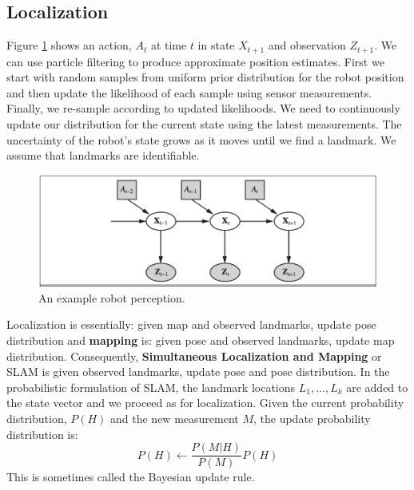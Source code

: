\documentclass[twoside]{article}
\begin{document}
\subsection{Localization}
Figure \ref{fig:localization} shows an action, \(A_t\) at time \(t\) in state 
\(X_{t+1}\) and observation \(Z_{t+1}\). We can use particle filtering to 
produce approximate position estimates. First we start with random samples from
uniform prior distribution for the robot position and then update the likelihood
of each sample using sensor measurements. Finally, we re-sample according to 
updated likelihoods. We need to continuously update our distribution for the 
current state using the latest measurements. The uncertainty of the robot's 
state grows as it moves until we find a landmark. We assume that landmarks are 
identifiable.
\begin{figure}
  \includegraphics[width=\linewidth]{localization.png}
  \caption{An example robot perception.}
  \label{fig:localization}
\end{figure}
Localization is essentially: given map and observed landmarks, update pose 
distribution and \textbf{mapping} is: given pose and observed landmarks, update
map distribution. Consequently, \textbf{Simultaneous Localization and Mapping} 
or SLAM is given observed landmarks, update pose and pose distribution. In the
probabilistic formulation of SLAM, the landmark locations \(L_1,...,L_k\) are 
added to the state vector and we proceed as for localization. Given the current 
probability distribution, \(P(H)\) and the new measurement \(M\), the update 
probability distribution is:
\begin{equation}
        P(H) \gets \frac{P(M|H)}{P(M)}P(H)
\end{equation}
This is sometimes called the Bayesian update rule.
\end{document}
